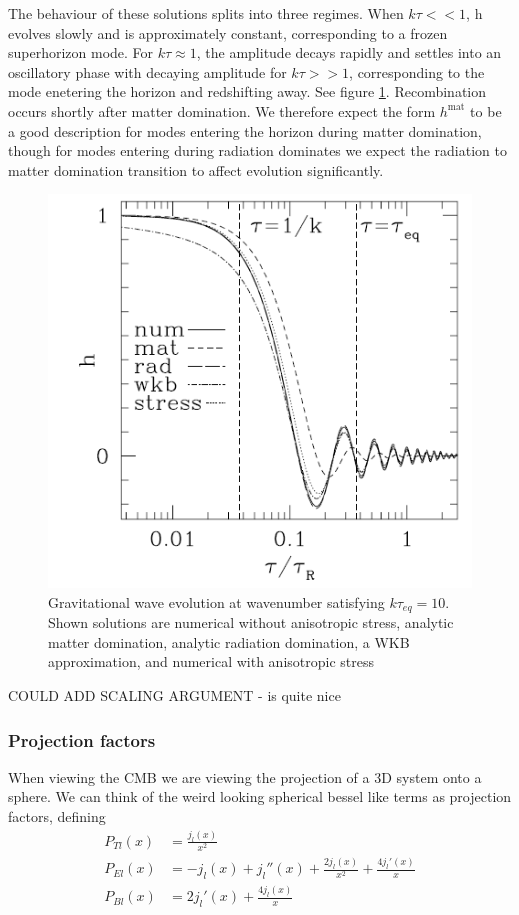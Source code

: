 \documentclass[a4paper,10pt]{article}
\begin{document}
The behaviour of these solutions splits into three regimes. When $k\tau<<1$, h evolves slowly and is approximately constant, corresponding to a frozen superhorizon mode. For $k\tau\approx1$, the amplitude decays rapidly and settles into an oscillatory phase with decaying amplitude for $k\tau>>1$, corresponding to the mode enetering the horizon and redshifting away. See figure \ref{gravwave}. Recombination occurs shortly after matter domination. We therefore expect the form $h^{\text{mat}}$ to be a good description for modes entering the horizon during matter domination, though for modes entering during radiation dominates we expect the radiation to matter domination transition to affect evolution significantly.\\

\begin{figure}[h]
  \includegraphics[width=0.5\linewidth]{gravwaveev.png}
  \centering
  \caption{Gravitational wave evolution at wavenumber satisfying $k\tau_{eq}=10$. Shown solutions are numerical without anisotropic stress, analytic matter domination, analytic radiation domination, a WKB approximation, and numerical with anisotropic stress}
  \label{gravwave}
\end{figure}




COULD ADD SCALING ARGUMENT - is quite nice


\subsubsection{Projection factors}

When viewing the CMB we are viewing the projection of a 3D system onto a sphere. We can think of the weird looking spherical bessel like terms as projection factors, defining
\begin{align}
P_{Tl}(x) &= \frac{j_l(x)}{x^2}\\
P_{El}(x) &= -j_l(x) +j_l''(x)+\frac{2j_l(x)}{x^2} + \frac{4j_l'(x)}{x}\\
P_{Bl}(x) &= 2j_l'(x)+\frac{4j_l(x)}{x}
\end{align}
\end{document}

